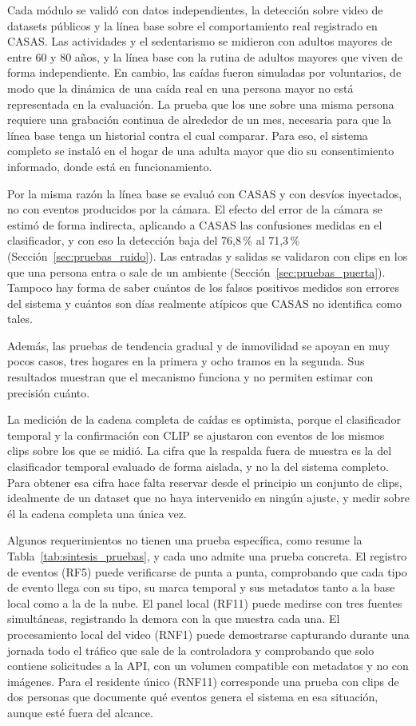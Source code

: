 Cada módulo se validó con datos independientes, la detección sobre video de datasets públicos y la línea base sobre el comportamiento real registrado en CASAS.
Las actividades y el sedentarismo se midieron con adultos mayores de entre 60 y 80 años, y la línea base con la rutina de adultos mayores que viven de forma independiente.
En cambio, las caídas fueron simuladas por voluntarios, de modo que la dinámica de una caída real en una persona mayor no está representada en la evaluación.
La prueba que los une sobre una misma persona requiere una grabación continua de alrededor de un mes, necesaria para que la línea base tenga un historial contra el cual comparar.
Para eso, el sistema completo se instaló en el hogar de una adulta mayor que dio su consentimiento informado, donde está en funcionamiento.

Por la misma razón la línea base se evaluó con CASAS y con desvíos inyectados, no con eventos producidos por la cámara.
El efecto del error de la cámara se estimó de forma indirecta, aplicando a CASAS las confusiones medidas en el clasificador, y con eso la detección baja del 76,8\,\% al 71,3\,\% (Sección~\ref{sec:pruebas_ruido}).
Las entradas y salidas se validaron con clips en los que una persona entra o sale de un ambiente (Sección~\ref{sec:pruebas_puerta}).
Tampoco hay forma de saber cuántos de los falsos positivos medidos son errores del sistema y cuántos son días realmente atípicos que CASAS no identifica como tales.

Además, las pruebas de tendencia gradual y de inmovilidad se apoyan en muy pocos casos, tres hogares en la primera y ocho tramos en la segunda.
Sus resultados muestran que el mecanismo funciona y no permiten estimar con precisión cuánto.

La medición de la cadena completa de caídas es optimista, porque el clasificador temporal y la confirmación con CLIP se ajustaron con eventos de los mismos clips sobre los que se midió.
La cifra que la respalda fuera de muestra es la del clasificador temporal evaluado de forma aislada, y no la del sistema completo.
Para obtener esa cifra hace falta reservar desde el principio un conjunto de clips, idealmente de un dataset que no haya intervenido en ningún ajuste, y medir sobre él la cadena completa una única vez.

Algunos requerimientos no tienen una prueba específica, como resume la Tabla~\ref{tab:sintesis_pruebas}, y cada uno admite una prueba concreta.
El registro de eventos (RF5) puede verificarse de punta a punta, comprobando que cada tipo de evento llega con su tipo, su marca temporal y sus metadatos tanto a la base local como a la de la nube.
El panel local (RF11) puede medirse con tres fuentes simultáneas, registrando la demora con la que muestra cada una.
El procesamiento local del video (RNF1) puede demostrarse capturando durante una jornada todo el tráfico que sale de la controladora y comprobando que solo contiene solicitudes a la API, con un volumen compatible con metadatos y no con imágenes.
Para el residente único (RNF11) corresponde una prueba con clips de dos personas que documente qué eventos genera el sistema en esa situación, aunque esté fuera del alcance.

